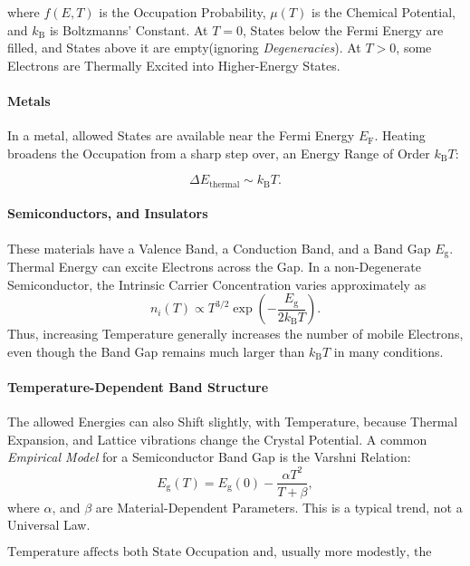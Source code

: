 \documentclass[a4paper, 10pt, onepage]{elegantbook}
\begin{document}
where \(f(E,T)\) is the Occupation Probability, \(\mu(T)\) is the Chemical Potential, and \(k_{\mathrm B}\) is Boltzmanns' Constant. At \(T=0\), States below the Fermi Energy are filled, and States above it are empty(ignoring \emph{Degeneracies}). At \(T>0\), some Electrons are Thermally Excited
into Higher-Energy States.

\paragraph{Metals}

In a metal, allowed States are available near the Fermi Energy \(E_{\mathrm F}\). Heating broadens the Occupation from a sharp step over, an Energy Range of
Order \(k_{\mathrm B}T\):

\[
\Delta E_{\mathrm{thermal}}\sim k_{\mathrm B}T.
\]

\paragraph{Semiconductors, and Insulators}

These materials have a Valence Band, a Conduction Band, and a Band Gap \(E_{\mathrm g}\). Thermal Energy can excite Electrons across the Gap. In a non-Degenerate Semiconductor, the Intrinsic Carrier Concentration varies approximately as
\[
n_i(T)\propto T^{3/2}
\exp\!\left(-\frac{E_{\mathrm g}}{2k_{\mathrm B}T}\right).
\]
Thus, increasing Temperature generally increases the number of mobile
Electrons, even though the Band Gap remains much larger than \(k_{\mathrm B}T\) in many conditions.

\paragraph{Temperature-Dependent Band Structure}

The allowed Energies can also Shift slightly, with Temperature, because Thermal Expansion, and Lattice vibrations change the Crystal Potential.
A common \emph{Empirical Model} for a Semiconductor Band Gap is the Varshni Relation:
\[
E_{\mathrm g}(T)
=
E_{\mathrm g}(0)
-
\frac{\alpha T^2}{T+\beta},
\]
where \(\alpha\), and \(\beta\) are Material-Dependent Parameters. This is a typical trend, not a Universal Law.

\[
\boxed{
\text{Temperature affects both State Occupation and, usually more modestly,
the Energies and widths of the allowed Bands.}
}
\]
\end{document}
